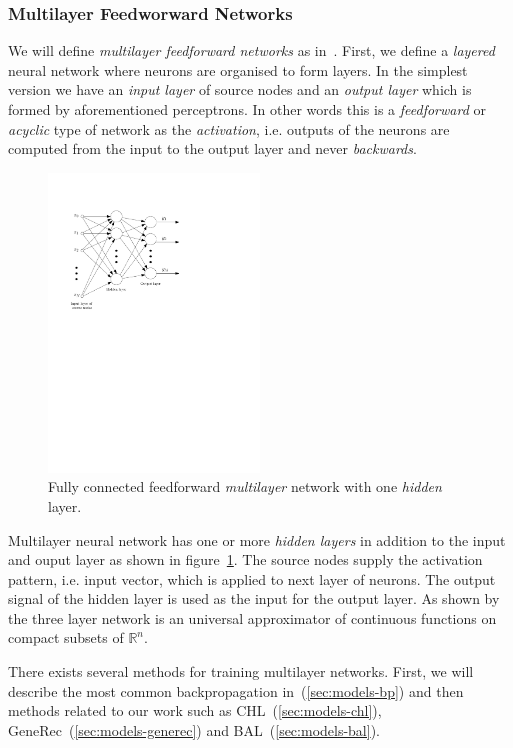 \subsubsection{Multilayer Feedworward Networks} 
\label{sec:theory-multilayer} 

We will define \emph{multilayer feedforward networks} as in~\citet{haykin1994neural}. First, we define a \emph{layered} neural network where neurons are organised to form layers. In the simplest version we have an \emph{input layer} of source nodes and an \emph{output layer} which is formed by aforementioned perceptrons. In other words this is a \emph{feedforward} or \emph{acyclic} type of network as the \emph{activation}, i.e. outputs of the neurons are computed from the input to the output layer and never \emph{backwards}. 

\begin{figure}[H]
  \centering
  \includegraphics[width=0.5\textwidth]{img/multilayer.pdf}    
  \caption{Fully connected feedforward \emph{multilayer} network with one \emph{hidden} layer. } 
  \label{fig:multilayer}
\end{figure}

Multilayer neural network has one or more \emph{hidden layers} in addition to the input and ouput layer as shown in figure~\ref{fig:multilayer}. The source nodes supply the activation pattern, i.e. input vector, which is applied to next layer of neurons. The output signal of the hidden layer is used as the input for the output layer. As shown by~\citet{cybenko1989approximation} the three layer network is an universal approximator of continuous functions on compact subsets of $\mathbb{R}^n$.

There exists several methods for training multilayer networks. First, we will describe the most common backpropagation in~(\ref{sec:models-bp}) and then methods related to our work such as CHL~(\ref{sec:models-chl}), GeneRec~(\ref{sec:models-generec}) and BAL~(\ref{sec:models-bal}). 
